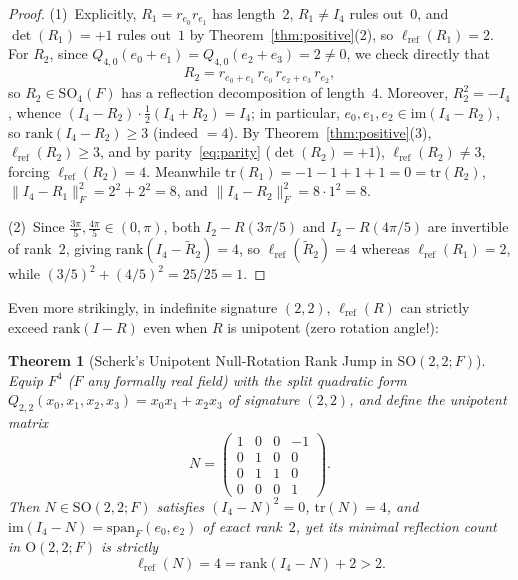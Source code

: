 \documentclass[11pt,a4paper]{article}
\theoremstyle{plain}
\newtheorem{theorem}{Theorem}[section]
\theoremstyle{definition}
\newcommand{\Orth}{\mathrm{O}}
\newcommand{\SO}{\mathrm{SO}}
\newcommand{\lref}{\ell_{\mathrm{ref}}}
\newcommand{\rk}{\mathrm{rank}}
\newcommand{\tr}{\mathrm{tr}}
\newcommand{\im}{\mathrm{im}}
\newcommand{\spn}{\mathrm{span}}
\begin{document}
\begin{proof}
(1)~Explicitly, $R_1 = r_{e_0} r_{e_1}$ has length~$2$, $R_1 \neq I_4$ rules out~$0$, and $\det(R_1) = +1$ rules out~$1$ by Theorem~\ref{thm:positive}(2), so $\lref(R_1) = 2$. For $R_2$, since $Q_{4,0}(e_0 + e_1) = Q_{4,0}(e_2 + e_3) = 2 \neq 0$, we check directly that
\[
  R_2 = r_{e_0 + e_1} \, r_{e_0} \, r_{e_2 + e_3} \, r_{e_2},
\]
so $R_2 \in \SO_4(F)$ has a reflection decomposition of length~$4$. Moreover, $R_2^2 = -I_4$, whence $(I_4 - R_2) \cdot \frac{1}{2}(I_4 + R_2) = I_4$; in particular, $e_0, e_1, e_2 \in \im(I_4 - R_2)$, so $\rk(I_4 - R_2) \ge 3$ (indeed $= 4$). By Theorem~\ref{thm:positive}(3), $\lref(R_2) \ge 3$, and by parity~\eqref{eq:parity} ($\det(R_2) = +1$), $\lref(R_2) \neq 3$, forcing $\lref(R_2) = 4$. Meanwhile $\tr(R_1) = -1 - 1 + 1 + 1 = 0 = \tr(R_2)$, $\|I_4 - R_1\|_F^2 = 2^2 + 2^2 = 8$, and $\|I_4 - R_2\|_F^2 = 8 \cdot 1^2 = 8$.

(2)~Since $\frac{3\pi}{5}, \frac{4\pi}{5} \in (0, \pi)$, both $I_2 - R(3\pi/5)$ and $I_2 - R(4\pi/5)$ are invertible of rank~$2$, giving $\rk(I_4 - \widetilde{R}_2) = 4$, so $\lref(\widetilde{R}_2) = 4$ whereas $\lref(R_1) = 2$, while $(3/5)^2 + (4/5)^2 = 25/25 = 1$.
\end{proof}

Even more strikingly, in indefinite signature $(2, 2)$, $\lref(R)$ can strictly exceed $\rk(I - R)$ even when $R$ is unipotent (zero rotation angle!):

\begin{theorem}[Scherk's Unipotent Null-Rotation Rank Jump in $\SO(2, 2; F)$]
\label{thm:scherk}
Equip $F^4$ ($F$ any formally real field) with the split quadratic form $Q_{2,2}(x_0, x_1, x_2, x_3) = x_0 x_1 + x_2 x_3$ of signature $(2, 2)$, and define the unipotent matrix
\begin{equation}\label{eq:scherkN}
  N = \begin{pmatrix}
    1 & 0 & 0 & -1 \\
    0 & 1 & 0 & 0 \\
    0 & 1 & 1 & 0 \\
    0 & 0 & 0 & 1
  \end{pmatrix}.
\end{equation}
Then $N \in \SO(2, 2; F)$ satisfies $(I_4 - N)^2 = 0$, $\tr(N) = 4$, and $\im(I_4 - N) = \spn_F(e_0, e_2)$ of exact rank~$2$, yet its minimal reflection count in $\Orth(2, 2; F)$ is strictly
\[
  \lref(N) = 4 = \rk(I_4 - N) + 2 > 2.
\]
\end{theorem}
\end{document}
